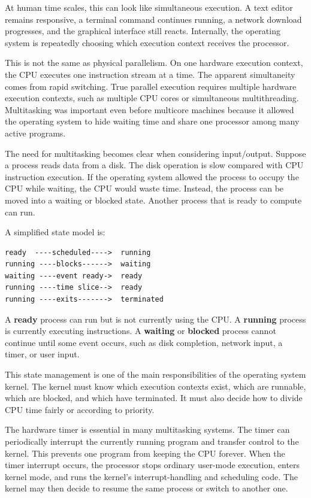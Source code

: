 At human time scales, this can look like simultaneous execution. A text editor remains responsive, a terminal command continues running, a network download progresses, and the graphical interface still reacts. Internally, the operating system is repeatedly choosing which execution context receives the processor.

This is not the same as physical parallelism. On one hardware execution context, the CPU executes one instruction stream at a time. The apparent simultaneity comes from rapid switching. True parallel execution requires multiple hardware execution contexts, such as multiple CPU cores or simultaneous multithreading. Multitasking was important even before multicore machines because it allowed the operating system to hide waiting time and share one processor among many active programs.

The need for multitasking becomes clear when considering input/output. Suppose a process reads data from a disk. The disk operation is slow compared with CPU instruction execution. If the operating system allowed the process to occupy the CPU while waiting, the CPU would waste time. Instead, the process can be moved into a waiting or blocked state. Another process that is ready to compute can run.

A simplified state model is:

\begin{verbatim}
ready  ----scheduled---->  running
running ----blocks------>  waiting
waiting ----event ready->  ready
running ----time slice-->  ready
running ----exits------->  terminated
\end{verbatim}

A \textbf{ready} process can run but is not currently using the CPU. A \textbf{running} process is currently executing instructions. A \textbf{waiting} or \textbf{blocked} process cannot continue until some event occurs, such as disk completion, network input, a timer, or user input.

This state management is one of the main responsibilities of the operating system kernel. The kernel must know which execution contexts exist, which are runnable, which are blocked, and which have terminated. It must also decide how to divide CPU time fairly or according to priority.

The hardware timer is essential in many multitasking systems. The timer can periodically interrupt the currently running program and transfer control to the kernel. This prevents one program from keeping the CPU forever. When the timer interrupt occurs, the processor stops ordinary user-mode execution, enters kernel mode, and runs the kernel's interrupt-handling and scheduling code. The kernel may then decide to resume the same process or switch to another one.

